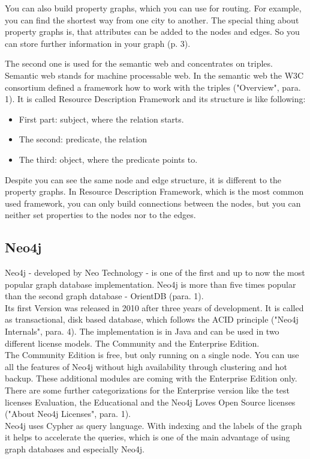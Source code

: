 You can also build property graphs, which you can use for routing. For example, you can find the shortest way from one city to another. The special thing about property graphs is, that attributes can be added to the nodes and edges. So you can store further information in your graph \cite{Rodriguez.Neubauer.2010} (p. 3).

The second one is used for the semantic web and concentrates on triples. Semantic web stands for machine processable web. In the semantic web the W3C consortium defined a framework how to work with the triples \cite{W3C.2014} ("Overview", para. 1). It is called Resource Description Framework and its structure is like following:

\begin{itemize}
	\item First part: subject, where the relation starts.
	\item The second: predicate, the relation
	\item The third: object, where the predicate points to.
\end{itemize}  

Despite you can see the same node and edge structure, it is different to the property graphs. In Resource Description Framework, which is the most common used framework, you can only build connections between the nodes, but you can neither set properties to the nodes nor to the edges.

\subsection{Neo4j}

Neo4j - developed by Neo Technology - is one of the first and up to now the most popular graph database implementation. Neo4j is more than five times popular than the second graph database - OrientDB  \cite{SolidITGmbH.2017}(para. 1).\\
Its first Version was released in 2010 after three years of development. It is called as transactional, disk based database, which follows the ACID principle \cite{NeoTechnologyInc.2017b} ("Neo4j Internals", para. 4). The implementation is in Java and can be used in two different license models. The Community and the Enterprise Edition.\\
The Community Edition is free, but only running on a single node. You can use all the features of Neo4j without high availability through clustering and hot backup. 
These additional modules are coming with the Enterprise Edition only. There are some further categorizations for the Enterprise version like the test licenses Evaluation, the Educational and the Neo4j Loves Open Source licenses \cite{NeoTechnologyInc.2017a} ("About Neo4j Licenses", para. 1).\\
Neo4j uses Cypher as query language. With indexing and the labels of the graph it helps to accelerate the queries, which is one of the main advantage of using graph databases and especially Neo4j.

